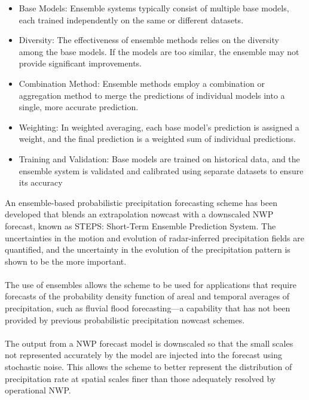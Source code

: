 \documentclass[../paper.tex]{subfiles}
\begin{document}
\begin{itemize}
    \item Base Models: Ensemble systems typically consist of multiple base models,
    each trained independently on the same or different datasets.

    \item Diversity: The effectiveness of ensemble methods relies on the diversity among the base models.
    If the models are too similar, the ensemble may not provide significant improvements.

    \item Combination Method:
    Ensemble methods employ a combination or aggregation method
    to merge the predictions of individual models into a single,
    more accurate prediction.

    \item Weighting: In weighted averaging, each base model's prediction is assigned a weight,
    and the final prediction is a weighted sum of individual predictions.

    \item Training and Validation: Base models are trained on historical data,
    and the ensemble system is validated and calibrated
    using separate datasets to ensure its accuracy
\end{itemize}

An ensemble-based probabilistic precipitation forecasting scheme has been developed that blends an extrapolation nowcast with a downscaled NWP forecast,
known as STEPS: Short-Term Ensemble Prediction System.
The uncertainties in the motion and evolution of radar-inferred precipitation fields are quantified,
and the uncertainty in the evolution of the precipitation pattern is shown to be the more important. \\\\
The use of ensembles allows the scheme
to be used for applications
that require forecasts of the probability density function of areal and temporal averages of precipitation,
such as fluvial flood forecasting—a capability
that has not been provided by previous probabilistic precipitation nowcast schemes. \\\\
The output from a NWP forecast model is downscaled
so that the small scales not represented accurately by the model are injected into the forecast
using stochastic noise.
This allows the scheme
to better represent the distribution of precipitation rate at spatial scales finer than those
adequately resolved by operational NWP\@.
\end{document}
